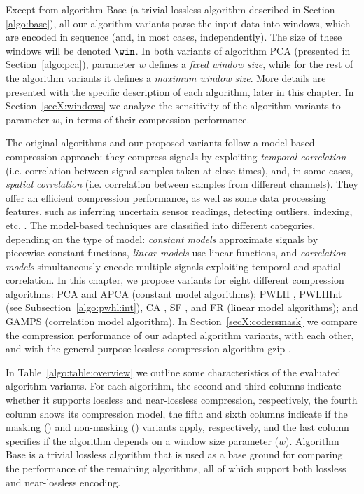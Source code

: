 Except from algorithm Base (a trivial lossless algorithm described in Section \ref{algo:base}), all our algorithm variants parse the input data into windows, which are encoded in sequence (and, in most cases, independently). The size of these windows will be denoted $\win$. In both variants of algorithm PCA (presented in Section~\ref{algo:pca}), parameter $w$ defines a \textit{fixed window size}, while for the rest of the algorithm variants it defines a \textit{maximum window size}. More details are presented with the specific description of each algorithm, later in this chapter. In Section~\ref{secX:windows} we analyze the sensitivity of the algorithm variants to parameter $w$, in terms of their compression performance.


The original algorithms and our proposed variants follow a model-based compression approach: they compress signals by exploiting \textit{temporal correlation} (i.e. correlation between signal samples taken at close times), and, in some cases, \textit{spatial correlation} (i.e. correlation between samples from different channels). They offer an efficient compression performance, as well as some data processing features, such as inferring uncertain sensor readings, detecting outliers, indexing, etc. \cite{AnEva2013}. The model-based techniques are classified into different categories, depending on the type of model: \textit{constant models} approximate signals by piecewise constant functions, \textit{linear models} use linear functions, and \textit{correlation models} simultaneously encode multiple signals exploiting temporal and spatial correlation. In this chapter, we propose variants for eight different compression algorithms: PCA \cite{coder:pca} and APCA \cite{coder:apca} (constant model algorithms); PWLH \cite{coder:pwlh}, PWLHInt (see Subsection~\ref{algo:pwhl:int}), CA \cite{coder:ca}, SF \cite{coder:sf}, and FR \cite{coder:fr} (linear model algorithms); and GAMPS \cite{coder:gamps} (correlation model algorithm). In Section~\ref{secX:codersmask} we compare the compression performance of our adapted algorithm variants, with each other, and with the general-purpose lossless compression algorithm gzip \cite{gzip}.


In Table~\ref{algo:table:overview} we outline some characteristics of the evaluated algorithm variants. For each algorithm, the second and third columns indicate whether it supports lossless and near-lossless compression, respectively, the fourth column shows its compression model, the fifth and sixth columns indicate if the masking (\maskalgo) and non-masking (\NOmaskalgo) variants apply, respectively, and the last column specifies if the algorithm depends on a window size parameter ($w$). Algorithm Base is a trivial lossless algorithm that is used as a base ground for comparing the performance of the remaining algorithms, all of which support both lossless and near-lossless encoding.


\clearpage




